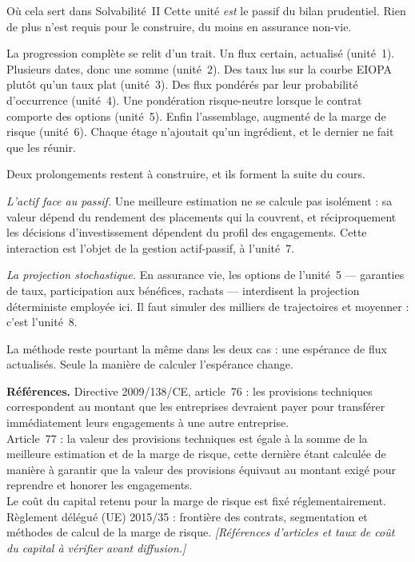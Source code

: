 \begin{pont}{Où cela sert dans Solvabilité~II}
Cette unité \emph{est} le passif du bilan prudentiel. Rien de plus n'est requis
pour le construire, du moins en assurance non-vie.

\medskip
La progression complète se relit d'un trait. Un flux certain, actualisé
(unité~1). Plusieurs dates, donc une somme (unité~2). Des taux lus sur la courbe
EIOPA plutôt qu'un taux plat (unité~3). Des flux pondérés par leur probabilité
d'occurrence (unité~4). Une pondération risque-neutre lorsque le contrat comporte
des options (unité~5). Enfin l'assemblage, augmenté de la marge de risque
(unité~6). Chaque étage n'ajoutait qu'un ingrédient, et le dernier ne fait que
les réunir.

\medskip
Deux prolongements restent à construire, et ils forment la suite du cours.

\emph{L'actif face au passif.} Une meilleure estimation ne se calcule pas
isolément : sa valeur dépend du rendement des placements qui la couvrent, et
réciproquement les décisions d'investissement dépendent du profil des
engagements. Cette interaction est l'objet de la gestion actif-passif, à
l'unité~7.

\emph{La projection stochastique.} En assurance vie, les options de l'unité~5
--- garanties de taux, participation aux bénéfices, rachats --- interdisent la
projection déterministe employée ici. Il faut simuler des milliers de
trajectoires et moyenner : c'est l'unité~8.

\medskip
La méthode reste pourtant la même dans les deux cas : une espérance de flux
actualisés. Seule la manière de calculer l'espérance change.
\end{pont}

\begin{refreg}
\textbf{Références.} Directive 2009/138/CE, article~76 : les provisions
techniques correspondent au montant que les entreprises devraient payer pour
transférer immédiatement leurs engagements à une autre entreprise. \\
Article~77 : la valeur des provisions techniques est égale à la somme de la
meilleure estimation et de la marge de risque, cette dernière étant calculée de
manière à garantir que la valeur des provisions équivaut au montant exigé pour
reprendre et honorer les engagements. \\
Le coût du capital retenu pour la marge de risque est fixé réglementairement. \\
Règlement délégué (UE) 2015/35 : frontière des contrats, segmentation et
méthodes de calcul de la marge de risque. \emph{[Références d'articles et taux
de coût du capital à vérifier avant diffusion.]}
\end{refreg}

